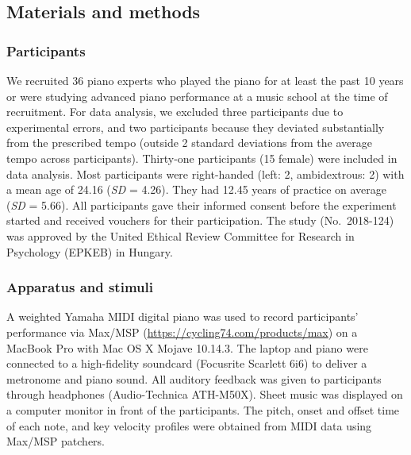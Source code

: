 \documentclass[
  english,
  man,floatsintext]{apa6}
\begin{document}
\hypertarget{materials-and-methods}{%
\subsection{Materials and methods}\label{materials-and-methods}}

\hypertarget{participants}{%
\subsubsection{Participants}\label{participants}}

We recruited 36 piano experts who played the piano for at least the past 10 years or were studying advanced piano performance at a music school at the time of recruitment. For data analysis, we excluded three participants due to experimental errors, and two participants because they deviated substantially from the prescribed tempo (outside 2 standard deviations from the average tempo across participants). Thirty-one participants (15 female) were included in data analysis. Most participants were right-handed (left: 2, ambidextrous: 2) with a mean age of 24.16 (\emph{SD} = 4.26). They had 12.45 years of practice on average (\emph{SD} = 5.66). All participants gave their informed consent before the experiment started and received vouchers for their participation. The study (No.~2018-124) was approved by the United Ethical Review Committee for Research in Psychology (EPKEB) in Hungary.

\hypertarget{apparatus-and-stimuli}{%
\subsubsection{Apparatus and stimuli}\label{apparatus-and-stimuli}}

A weighted Yamaha MIDI digital piano was used to record participants' performance via Max/MSP (\url{https://cycling74.com/products/max}) on a MacBook Pro with Mac OS X Mojave 10.14.3. The laptop and piano were connected to a high-fidelity soundcard (Focusrite Scarlett 6i6) to deliver a metronome and piano sound. All auditory feedback was given to participants through headphones (Audio-Technica ATH-M50X). Sheet music was displayed on a computer monitor in front of the participants. The pitch, onset and offset time of each note, and key velocity profiles were obtained from MIDI data using Max/MSP patchers.
\end{document}
